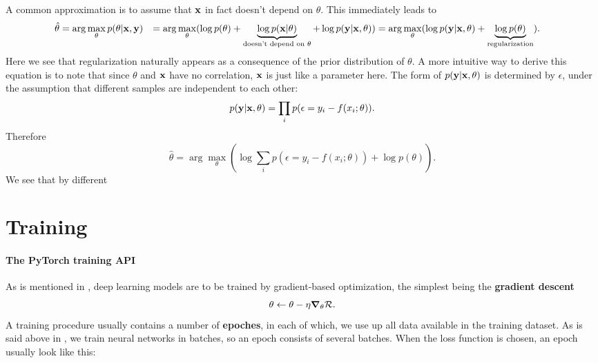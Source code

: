 \documentclass[hyperref, a4paper, 12pt]{report}
\newcommand*{\argmax}{\arg\max}
\newcommand*{\concept}[1]{{\textbf{#1}}}
\def\\{}%
\begin{document}
A common approximation is to assume that $\vb{x}$ in fact doesn't depend on $\theta$.
This immediately leads to 
\begin{equation}
    \begin{aligned}
        \hat{\theta} &= \argmax_\theta p(\theta | \vb{x}, \vb{y}) \\
        &= \argmax_\theta (\log p(\theta) + \underbrace{\log p(\vb{x} | \theta)}_{\text{doesn't  depend on $\theta$}} + \log p(\vb{y} | \vb{x}, \theta)) \\
        &= \argmax_\theta (\log p(\vb{y} | \vb{x}, \theta) + \underbrace{\log p(\theta)}_{\text{regularization}}) .
    \end{aligned}
\end{equation}
Here we see that regularization naturally appears as a consequence of the prior distribution of $\theta$.
A more intuitive way to derive this equation is to note that since $\theta$ and $\vb{x}$ have no correlation,
$\vb{x}$ is just like a parameter here.
The form of $p(\vb{y} | \vb{x}, \theta)$ is determined by $\epsilon$,
under the assumption that different samples are independent to each other:
\begin{equation}
    p(\vb{y} | \vb{x}, \theta) = \prod_i p(\epsilon = y_i - f(x_i; \theta)).
\end{equation}
Therefore 
\begin{equation}
    \hat{\theta} = \argmax_\theta \left( \log \sum_i p(\epsilon = y_i- f(x_i; \theta)) + \log p(\theta) \right).
\end{equation}
We see that by different 

\section{Training}

\paragraph*{The PyTorch training API}
As is mentioned in , deep learning models are to be trained by gradient-based optimization,
the simplest being the \concept{gradient descent}
\begin{equation}
    \theta \leftarrow \theta - \eta \grad_\theta \mathcal{R}.
\end{equation}
A training procedure usually contains a number of \concept{epoches},
in each of which, we use up all data available in the training dataset.
As is said above in , 
we train neural networks in batches, so an epoch consists of several batches.
When the loss function is chosen, 
an epoch usually look like this:
\end{document}
